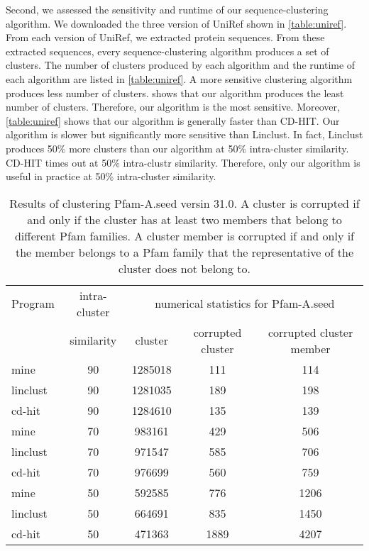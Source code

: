 \documentclass[]{article}
\begin{document}
Second, we assessed the sensitivity and runtime of our sequence-clustering algorithm.
We downloaded the three version of UniRef \cite{suzek2007uniref} shown in \cref{table:uniref}.
From each version of UniRef, we extracted protein sequences.
From these extracted sequences, every sequence-clustering algorithm produces a set of clusters.
The number of clusters produced by each algorithm and the runtime of each algorithm are listed in \cref{table:uniref}.
A more sensitive clustering algorithm produces less number of clusters.
 shows that our algorithm produces the least number of clusters.
Therefore, our algorithm is the most sensitive.
Moreover, \cref{table:uniref} shows that our algorithm is generally faster than CD-HIT.
Our algorithm is slower but significantly more sensitive than Linclust.
In fact, Linclust produces 50\% more clusters than our algorithm at 50\% intra-cluster similarity.
CD-HIT times out at 50\% intra-clustr similarity.
Therefore, only our algorithm is useful in practice at 50\% intra-cluster similarity.

\begin{table}%
	\centering
	\caption{Results of clustering Pfam-A.seed versin 31.0.
		A cluster is corrupted if and only if the cluster has at least two members that belong to different Pfam families.
		A cluster member is corrupted if and only if the member belongs to a Pfam family that the representative of the cluster does not belong to.
	}
	\begin{tabular}{l c c c c}
		\toprule
		Program & intra-cluster & 
		\multicolumn{3}{c}{numerical statistics for Pfam-A.seed} \\
		& similarity    & cluster & corrupted cluster & corrupted cluster member \\
		\midrule
		mine     & 90 & 1285018 & 111 & 114 \\
		linclust & 90 & 1281035 & 189 & 198 \\
		cd-hit   & 90 & 1284610 & 135 & 139 \\
		
		mine     & 70 & 983161 & 429 & 506 \\
		linclust & 70 & 971547 & 585 & 706 \\
		cd-hit   & 70 & 976699 & 560 & 759 \\
		
		mine     & 50 & 592585 & 776 & 1206 \\
		linclust & 50 & 664691 & 835 & 1450 \\
		cd-hit   & 50 & 471363 & 1889 & 4207 \\
		
		\bottomrule
	\end{tabular}
	\label{table:pfam}
\end{table}
\end{document}
